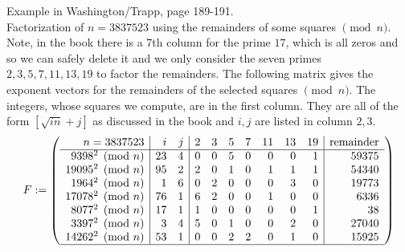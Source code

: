 \documentclass{report}
\begin{document}
Example in Washington/Trapp, page 189-191.\\

Factorization of $n=3837523$  using the  remainders of some squares $\pmod{n}$.
Note, in the book there is a 7th  column for the prime $17$, which is 
all zeros and so we can safely delete it and we only consider
the seven primes $2,3,5,7,11,13,19$ to factor the remainders.  The following matrix
gives the exponent vectors for the remainders of the selected  squares $\pmod{n}$.
The integers, whose squares we compute, are  in the first column.
They are all of  the form $[\sqrt{i n} +j]$ as discussed in the book and $i,j$
are listed in column $2,3$. \\
\[
F := \left(\begin{array}{r|rr|rrrrrrr|r}
n=3837523   & i & j & 2 & 3 & 5 & 7 & 11 & 13 & 19 & {\rm remainder} \\ \hline
 9398^2 \pmod{n} & 23 & 4  & 0 & 0 & 5 & 0 & 0 & 0 &  1 & 59375 \\
 19095^2 \pmod{n} & 95 & 2  & 2 & 0 & 1 & 0 & 1 & 1 &  1 & 54340 \\
 1964^2 \pmod{n} & 1 & 6  & 0 & 2 & 0 & 0 & 0 & 3 &  0 &  19773 \\
 17078^2 \pmod{n} & 76 & 1  & 6 & 2 & 0 & 0 & 1 & 0 &  0 & 6336 \\
 8077^2 \pmod{n} & 17 & 1  & 1 & 0 & 0 & 0 & 0 & 0 &  1 &  38 \\
 3397^2 \pmod{n} & 3 & 4  & 5 & 0 & 1 & 0 & 0 & 2 &  0 &  27040 \\
 14262^2 \pmod{n} & 53 & 1  & 0 & 0 & 2 & 2 & 0 & 1 &  0 & 15925 \\ \hline
 \end{array}\right) 
\]
\end{document}

